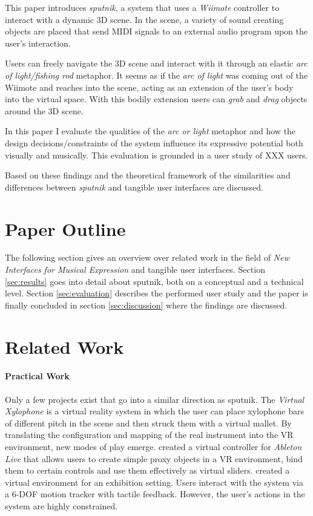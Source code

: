 \documentclass[10pt,a4paper]{scrartcl}
\begin{document}
This paper introduces \emph{sputnik}, a system that uses a \emph{Wiimote} controller to interact with a dynamic 3D scene. In the scene, a variety of sound creating objects are placed that send MIDI signals to an external audio program upon the user's interaction. 

Users can freely navigate the 3D scene and interact with it through an elastic \emph{arc of light/fishing rod} metaphor. It seems as if the \emph{arc of light} was coming out of the Wiimote and reaches into the scene, acting as an extension of the user's body into the virtual space. With this bodily extension users can \emph{grab} and \emph{drag} objects around the 3D scene.



In this paper I evaluate the qualities of the \emph{arc or light} metaphor and how the design decisions/constraints of the system influence its expressive potential both visually and musically. This evaluation is grounded in a user study of XXX users.

Based on these findings and the theoretical framework of \cite{Ullmer2000} the similarities and differences between \emph{sputnik} and tangible user interfaces are discussed. 


\section{Paper Outline}
The following section gives an overview over related work in the field of \emph{New Interfaces for Musical Expression} and tangible user interfaces. Section \ref{sec:results} goes into detail about sputnik, both on a conceptual and a technical level. Section \ref{sec:evaluation} describes the performed user study and the paper is finally concluded in section \ref{sec:discussion} where the findings are discussed.


\section{Related Work}
\paragraph{Practical Work}
Only a few projects exist that go into a similar direction as sputnik. The \emph{Virtual Xylophone}\cite{Maki-Patola2005} is a virtual reality system in which the user can place xylophone bars of different pitch in the scene and then struck them with a virtual mallet. By translating the configuration and mapping of the real instrument into the VR environment, new modes of play emerge.
\cite{Zappi2010} created a virtual controller for \emph{Ableton Live} that allows users to create simple proxy objects in a VR environment, bind them to certain controls and use them effectively as virtual sliders. \cite{Rodet2005} created a virtual environment for an exhibition setting. Users interact with the system via a 6-DOF motion tracker with tactile feedback. However, the user's actions in the system are highly constrained.
\end{document}
